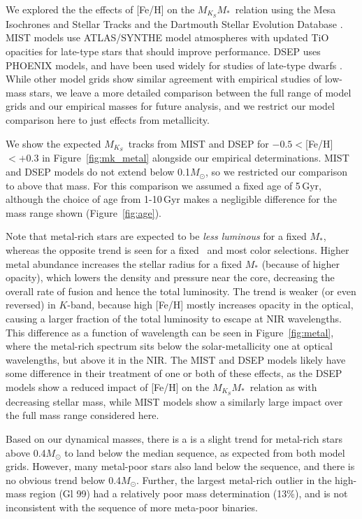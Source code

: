 \documentclass[twocolumn]{aastex62}
\newcommand{\mks}{$M_{K_S}$}
\newcommand{\mmk}{$M_{K_S}$\textendash$M_*$}
\begin{document}
We explored the the effects of [Fe/H] on the \mmk\ relation using the Mesa Isochrones and Stellar Tracks \citep[MIST,][]{MIST0,MIST1} and the Dartmouth Stellar Evolution Database \citep[DSEP,][]{Dotter2008}. MIST models use ATLAS/SYNTHE model atmospheres \citep{2004astro.ph..5087C} with updated TiO opacities for late-type stars that should improve performance. DSEP uses PHOENIX \cite{Hauschildt1999,1999ApJ...525..871H} models, and have been used widely for studies of late-type dwarfs \citep[e.g.,][]{Boyajian2012,2015MNRAS.454..593B,2018arXiv180404133K}. While other model grids \citep[e.g.,YaPSI, PARSEC, Lyon][]{Spada2013,Chen2014,BHAC15} show similar agreement with empirical studies of low-mass stars, we leave a more detailed comparison between the full range of model grids and our empirical masses for future analysis, and we restrict our model comparison here to just effects from metallicity. 

We show the expected \mks\ tracks from MIST and DSEP for $-0.5<$[Fe/H]$<+0.3$ in Figure~\ref{fig:mk_metal} alongside our empirical determinations. MIST and DSEP models do not extend below 0.1$M_\odot$, so we restricted our comparison to above that mass. For this comparison we assumed a fixed age of 5\,Gyr, although the choice of age from 1-10\,Gyr makes a negligible difference for the mass range shown (Figure~\ref{fig:age}). 

Note that metal-rich stars are expected to be {\it less luminous} for a fixed $M_*$, whereas the opposite trend is seen for a fixed \teff\ and most color selections. Higher metal abundance increases the stellar radius for a fixed $M_*$ (because of higher opacity), which lowers the density and pressure near the core, decreasing the overall rate of fusion and hence the total luminosity. The trend is weaker (or even reversed) in $K$-band, because high [Fe/H] mostly increases opacity in the optical, causing a larger fraction of the total luminosity to escape at NIR wavelengths. This difference as a function of wavelength can be seen in Figure~\ref{fig:metal}, where the metal-rich spectrum sits below the solar-metallicity one at optical wavelengths, but above it in the NIR. The MIST and DSEP models likely have some difference in their treatment of one or both of these effects, as the DSEP models show a reduced impact of [Fe/H] on the \mmk\ relation as with decreasing stellar mass, while MIST models show a similarly large impact over the full mass range considered here. 

Based on our dynamical masses, there is a is a slight trend for metal-rich stars above 0.4$M_\odot$ to land below the median sequence, as expected from both model grids. However, many metal-poor stars also land below the sequence, and there is no obvious trend below 0.4$M_\odot$. Further, the largest metal-rich outlier in the high-mass region (Gl 99) had a relatively poor mass determination (13\%), and is not inconsistent with the sequence of more meta-poor binaries. 
\end{document}
